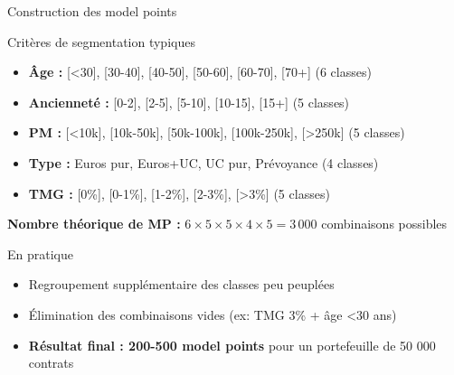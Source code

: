 \documentclass[10pt,aspectratio=169]{beamer}
\begin{document}
\begin{frame}{Construction des model points}
\begin{block}{Critères de segmentation typiques}
\begin{itemize}
    \item \textbf{Âge :} [<30], [30-40], [40-50], [50-60], [60-70], [70+]  \hfill (6 classes)
    \item \textbf{Ancienneté :} [0-2], [2-5], [5-10], [10-15], [15+]  \hfill (5 classes)
    \item \textbf{PM :} [<10k], [10k-50k], [50k-100k], [100k-250k], [>250k]  \hfill (5 classes)
    \item \textbf{Type :} Euros pur, Euros+UC, UC pur, Prévoyance  \hfill (4 classes)
    \item \textbf{TMG :} [0\%], [0-1\%], [1-2\%], [2-3\%], [>3\%]  \hfill (5 classes)
\end{itemize}
\end{block}

\textbf{Nombre théorique de MP :} $6 \times 5 \times 5 \times 4 \times 5 = 3\,000$ combinaisons possibles

\vspace{0.3cm}
\begin{alertblock}{En pratique}
\begin{itemize}
    \item Regroupement supplémentaire des classes peu peuplées
    \item Élimination des combinaisons vides (ex: TMG 3\% + âge <30 ans)
    \item \textbf{Résultat final : 200-500 model points} pour un portefeuille de 50 000 contrats
\end{itemize}
\end{alertblock}
\end{frame}
\end{document}
